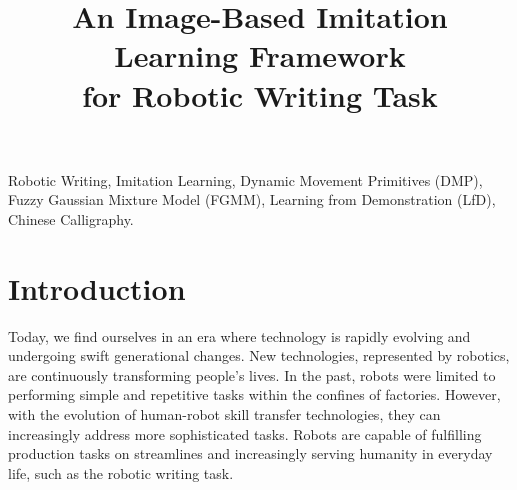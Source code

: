 \documentclass[conference]{IEEEtran}
\begin{document}
\title{An Image-Based Imitation Learning Framework \\ for Robotic Writing Task}
\author{
\and
{}
}
\maketitle
\begin{abstract}

\end{abstract}

\begin{IEEEkeywords}
Robotic Writing, Imitation Learning, Dynamic Movement Primitives (DMP), Fuzzy Gaussian Mixture Model (FGMM), Learning from Demonstration (LfD), Chinese Calligraphy.
\end{IEEEkeywords}

\section{Introduction}
Today, we find ourselves in an era where technology is rapidly evolving and undergoing swift generational changes. New technologies, represented by robotics, are continuously transforming people's lives. In the past, robots were limited to performing simple and repetitive tasks within the confines of factories. However, with the evolution of human-robot skill transfer technologies, they can increasingly address more sophisticated tasks. Robots are capable of fulfilling production tasks on streamlines and increasingly serving humanity in everyday life, such as the robotic writing task.
\end{document}
